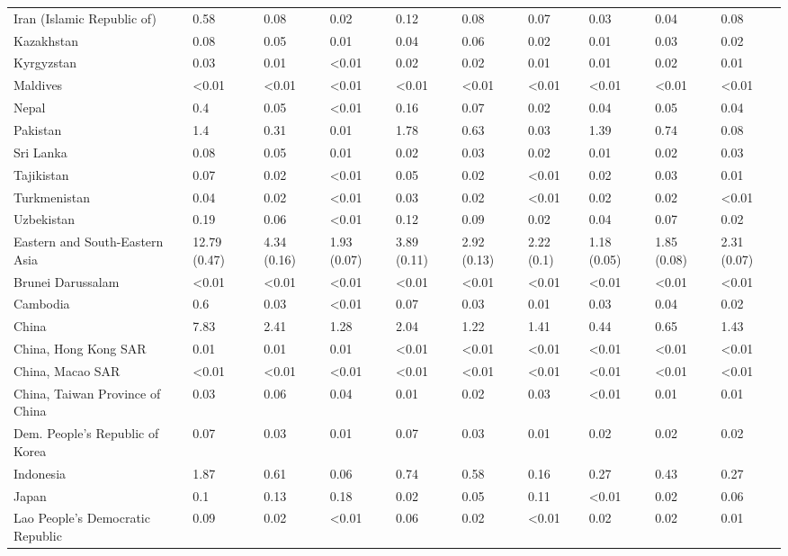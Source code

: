 \begin{longtable}[t]{llllllllll}
Iran (Islamic Republic of) & 0.58 & 0.08 & 0.02 & 0.12 & 0.08 & 0.07 & 0.03 & 0.04 & 0.08\\
Kazakhstan & 0.08 & 0.05 & 0.01 & 0.04 & 0.06 & 0.02 & 0.01 & 0.03 & 0.02\\
\addlinespace
Kyrgyzstan & 0.03 & 0.01 & <0.01 & 0.02 & 0.02 & 0.01 & 0.01 & 0.02 & 0.01\\
Maldives & <0.01 & <0.01 & <0.01 & <0.01 & <0.01 & <0.01 & <0.01 & <0.01 & <0.01\\
Nepal & 0.4 & 0.05 & <0.01 & 0.16 & 0.07 & 0.02 & 0.04 & 0.05 & 0.04\\
Pakistan & 1.4 & 0.31 & 0.01 & 1.78 & 0.63 & 0.03 & 1.39 & 0.74 & 0.08\\
Sri Lanka & 0.08 & 0.05 & 0.01 & 0.02 & 0.03 & 0.02 & 0.01 & 0.02 & 0.03\\
\addlinespace
Tajikistan & 0.07 & 0.02 & <0.01 & 0.05 & 0.02 & <0.01 & 0.02 & 0.03 & 0.01\\
Turkmenistan & 0.04 & 0.02 & <0.01 & 0.03 & 0.02 & <0.01 & 0.02 & 0.02 & <0.01\\
Uzbekistan & 0.19 & 0.06 & <0.01 & 0.12 & 0.09 & 0.02 & 0.04 & 0.07 & 0.02\\
Eastern and South-Eastern Asia & 12.79 (0.47) & 4.34 (0.16) & 1.93 (0.07) & 3.89 (0.11) & 2.92 (0.13) & 2.22 (0.1) & 1.18 (0.05) & 1.85 (0.08) & 2.31 (0.07)\\
Brunei Darussalam & <0.01 & <0.01 & <0.01 & <0.01 & <0.01 & <0.01 & <0.01 & <0.01 & <0.01\\
\addlinespace
Cambodia & 0.6 & 0.03 & <0.01 & 0.07 & 0.03 & 0.01 & 0.03 & 0.04 & 0.02\\
China & 7.83 & 2.41 & 1.28 & 2.04 & 1.22 & 1.41 & 0.44 & 0.65 & 1.43\\
China, Hong Kong SAR & 0.01 & 0.01 & 0.01 & <0.01 & <0.01 & <0.01 & <0.01 & <0.01 & <0.01\\
China, Macao SAR & <0.01 & <0.01 & <0.01 & <0.01 & <0.01 & <0.01 & <0.01 & <0.01 & <0.01\\
China, Taiwan Province of China & 0.03 & 0.06 & 0.04 & 0.01 & 0.02 & 0.03 & <0.01 & 0.01 & 0.01\\
\addlinespace
Dem. People's Republic of Korea & 0.07 & 0.03 & 0.01 & 0.07 & 0.03 & 0.01 & 0.02 & 0.02 & 0.02\\
Indonesia & 1.87 & 0.61 & 0.06 & 0.74 & 0.58 & 0.16 & 0.27 & 0.43 & 0.27\\
Japan & 0.1 & 0.13 & 0.18 & 0.02 & 0.05 & 0.11 & <0.01 & 0.02 & 0.06\\
Lao People's Democratic Republic & 0.09 & 0.02 & <0.01 & 0.06 & 0.02 & <0.01 & 0.02 & 0.02 & 0.01\\

\end{longtable}
